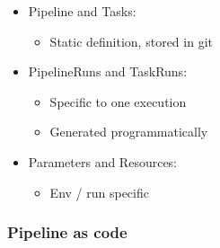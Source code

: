 \documentclass[aspectratio=169,11pt,hyperref={colorlinks=true}]{beamer}
\begin{document}
\begin{lblackrwhiteframe}
\begin{lblackrwhiteframe}
\begin{blackframe}
\begin{2columnsframe}
  {
  \begin{itemize}
    \item Pipeline and Tasks:
    \begin{itemize}
      \item Static definition, stored in git
    \end{itemize}
    \item PipelineRuns and TaskRuns:
    \begin{itemize}
      \item Specific to one execution
      \item Generated programmatically
    \end{itemize}
    \item Parameters and Resources:
    \begin{itemize}
      \item Env / run specific
    \end{itemize}
  \end{itemize}
  \vspace{0.3ex}
  
  }
  {
  
  \vspace{0.3ex}
  
  }
  \frametitle{Pipeline as code}
\end{2columnsframe}

%


\end{blackframe}
\end{lblackrwhiteframe}
\end{lblackrwhiteframe}
\end{document}
